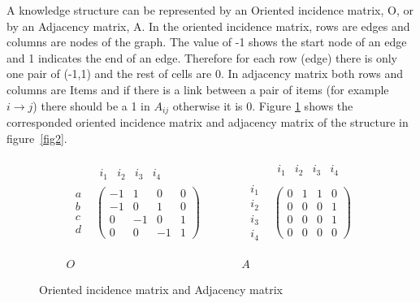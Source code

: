 A knowledge structure can be represented by an Oriented incidence matrix, O, or by an Adjacency matrix, A. In the oriented incidence matrix, rows are edges and columns are nodes of the graph. The value of -1 shows the start node of an edge and 1 indicates the end of an edge. Therefore for each row (edge) there is only one pair of (-1,1) and the rest of cells are 0. In adjacency matrix both rows and columns are Items and if there is a link between a pair of items (for example $i\rightarrow j$) there should be a 1 in $A_{ij}$ otherwise it is 0. Figure \ref{fig3IMAM} shows the corresponded oriented incidence matrix and adjacency matrix of the structure in figure~\ref{fig2}. 


\begin{figure}[h]
\[
\begin{array}{ccccc}
\begin{array}{cc}
 & \begin{array}{cccc}
i_{1} & i_{2} & i_{3} & i_{4}\end{array}\\
\begin{array}{c}
a\\
b\\
c\\
d
\end{array} & \left(\begin{array}{cccc}
-1 & 1 & 0 & 0\\
-1 & 0 & 1 & 0\\
0 & -1 & 0 & 1\\
0 & 0 & -1 & 1
\end{array}\right)
\end{array} &  &  &  & \begin{array}{cc}
 & \begin{array}{cccc}
i_{1} & i_{2} & i_{3} & i_{4}\end{array}\\
\begin{array}{c}
i_{1}\\
i_{2}\\
i_{3}\\
i_{4}
\end{array} & \left(\begin{array}{cccc}
0 & 1 & 1 & 0\\
0 & 0 & 0 & 1\\
0 & 0 & 0 & 1\\
0 & 0 & 0 & 0
\end{array}\right)
\end{array}\\
\\
\\
O &  &  &  & A
\end{array}
\]


\caption{Oriented incidence matrix and Adjacency matrix}
\label{fig3IMAM}
\end{figure}


